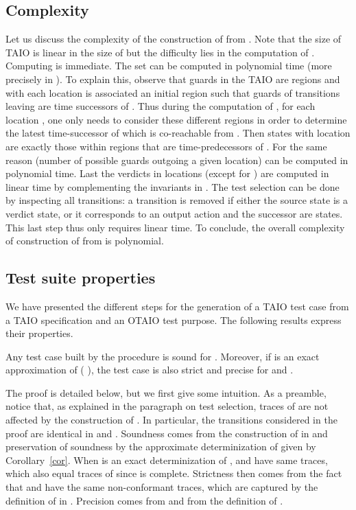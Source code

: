 \documentclass{LMCS}
\theoremstyle{plain}\newtheorem{proposition}[thm]{Proposition}
\begin{document}
\subsection*{Complexity}
Let us discuss the complexity of the construction of  from
  . Note that the size of TAIO  is linear in the size of
   but the difficulty lies in the computation of
  . Computing  is immediate. 
The set  can be computed in polynomial time (more
  precisely in ). To
  explain this, observe that guards in the TAIO  are regions and
  with each location  is associated an initial region 
  such that guards of transitions leaving  are time successors of
  . Thus during the computation of , for each
  location , one only needs to consider these  different regions in order to determine the
  latest time-successor  of  which is
  co-reachable from . Then  states with location 
  are exactly those within regions that are time-predecessors of
  . For the same reason (number of possible guards
  outgoing a given location)  can be computed in
  polynomial time. Last the  verdicts in locations (except for
  ) are computed in linear time by complementing the
  invariants in .
The test selection can be done by inspecting all transitions: a
  transition is removed if either the source state is a verdict state,
  or it corresponds to an output action and the successor are
   states. This last step thus only requires linear time.
To conclude, the overall complexity of construction of  from
   is polynomial.  

\subsection{Test suite properties}
We have presented the different steps for the generation of 
a TAIO test case from a TAIO specification and an OTAIO test purpose.
The following results express their properties.

\begin{thm}\label{theorem-TC}
  Any test case  built by the procedure is sound for .
  Moreover, if  is an exact approximation of  (\ie
  ), the test case  is also strict
  and precise for  and .
\end{thm}

The proof is detailed below, but we first give some intuition.
As a preamble, notice that, as explained in the paragraph on test selection, 
traces of  are not affected by the construction of .
In particular, the transitions considered in the proof are identical in  and .
Soundness comes from 
the construction of  in  and preservation of soundness by the approximate determinization  of 
given by Corollary~\ref{cor}.
When  is an exact determinization of ,
 and  have same traces, which also equal traces of  
since  is complete. 
Strictness then comes from the fact that  and  
 have the same non-conformant traces,
which are captured by the definition of  in .
Precision comes from  and from the definition of .
\end{document}
